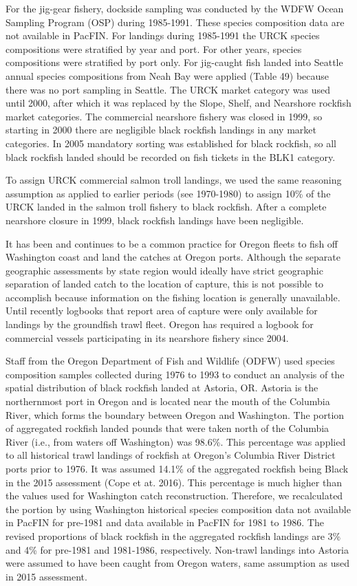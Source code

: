 \documentclass[11pt,
  english,
  letterpaper,
]{article}
\begin{document}
For the jig-gear fishery, dockside sampling was conducted by the WDFW Ocean Sampling Program (OSP) during 1985-1991. These species composition data are not available in PacFIN. For landings during 1985-1991 the URCK species compositions were stratified by year and port. For other years, species compositions were stratified by port only. For jig-caught fish landed into Seattle annual species compositions from Neah Bay were applied (Table 49) because there was no port sampling in Seattle. The URCK market category was used until 2000, after which it was replaced by the Slope, Shelf, and Nearshore rockfish market categories. The commercial nearshore fishery was closed in 1999, so starting in 2000 there are negligible black rockfish landings in any market categories. In 2005 mandatory sorting was established for black rockfish, so all black rockfish landed should be recorded on fish tickets in the BLK1 category.

To assign URCK commercial salmon troll landings, we used the same reasoning assumption as applied to earlier periods (see 1970-1980) to assign 10\% of the URCK landed in the salmon troll fishery to black rockfish. After a complete nearshore closure in 1999, black rockfish landings have been negligible.

It has been and continues to be a common practice for Oregon fleets to fish off Washington coast and land the catches at Oregon ports. Although the separate geographic assessments by state region would ideally have strict geographic separation of landed catch to the location of capture, this is not possible to accomplish because information on the fishing location is generally unavailable. Until recently logbooks that report area of capture were only available for landings by the groundfish trawl fleet. Oregon has required a logbook for commercial vessels participating in its nearshore fishery since 2004.

Staff from the Oregon Department of Fish and Wildlife (ODFW) used species composition samples collected during 1976 to 1993 to conduct an analysis of the spatial distribution of black rockfish landed at Astoria, OR. Astoria is the northernmost port in Oregon and is located near the mouth of the Columbia River, which forms the boundary between Oregon and Washington. The portion of aggregated rockfish landed pounds that were taken north of the Columbia River (i.e., from waters off Washington) was 98.6\%. This percentage was applied to all historical trawl landings of rockfish at Oregon's Columbia River District ports prior to 1976. It was assumed 14.1\% of the aggregated rockfish being Black in the 2015 assessment (Cope et at. 2016). This percentage is much higher than the values used for Washington catch reconstruction. Therefore, we recalculated the portion by using Washington historical species composition data not available in PacFIN for pre-1981 and data available in PacFIN for 1981 to 1986. The revised proportions of black rockfish in the aggregated rockfish landings are 3\% and 4\% for pre-1981 and 1981-1986, respectively. Non-trawl landings into Astoria were assumed to have been caught from Oregon waters, same assumption as used in 2015 assessment.
\end{document}
